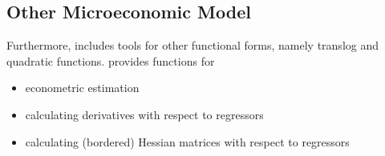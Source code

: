 \subsection{Other Microeconomic Model}

Furthermore,  includes tools for other functional forms,
namely translog and quadratic functions.
 provides functions for
\begin{itemize}
\item econometric estimation
\item calculating derivatives with respect to regressors
\item calculating (bordered) Hessian matrices with respect to regressors
\end{itemize}
